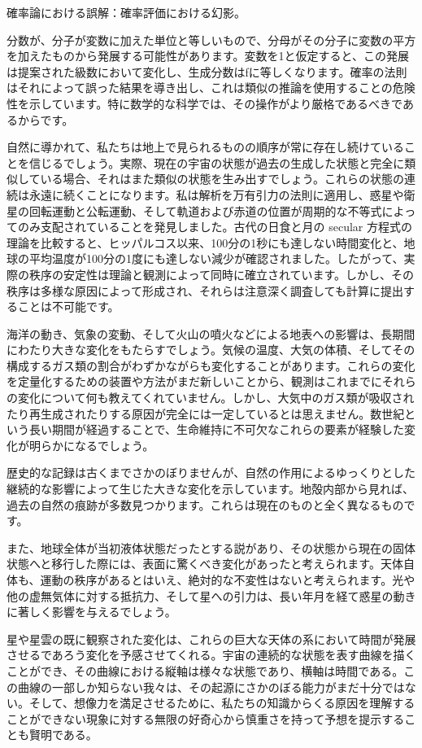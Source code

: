 \documentclass[a4paper,11pt,openany]{ltjsbook}
\begin{document}
確率論における誤解：確率評価における幻影。

分数が、分子が変数に加えた単位と等しいもので、分母がその分子に変数の平方を加えたものから発展する可能性があります。変数を1と仮定すると、この発展は提案された級数において変化し、生成分数はfに等しくなります。確率の法則はそれによって誤った結果を導き出し、これは類似の推論を使用することの危険性を示しています。特に数学的な科学では、その操作がより厳格であるべきであるからです。

自然に導かれて、私たちは地上で見られるものの順序が常に存在し続けていることを信じるでしょう。実際、現在の宇宙の状態が過去の生成した状態と完全に類似している場合、それはまた類似の状態を生み出すでしょう。これらの状態の連続は永遠に続くことになります。私は解析を万有引力の法則に適用し、惑星や衛星の回転運動と公転運動、そして軌道および赤道の位置が周期的な不等式によってのみ支配されていることを発見しました。古代の日食と月の secular 方程式の理論を比較すると、ヒッパルコス以来、100分の1秒にも達しない時間変化と、地球の平均温度が100分の1度にも達しない減少が確認されました。したがって、実際の秩序の安定性は理論と観測によって同時に確立されています。しかし、その秩序は多様な原因によって形成され、それらは注意深く調査しても計算に提出することは不可能です。

海洋の動き、気象の変動、そして火山の噴火などによる地表への影響は、長期間にわたり大きな変化をもたらすでしょう。気候の温度、大気の体積、そしてその構成するガス類の割合がわずかながらも変化することがあります。これらの変化を定量化するための装置や方法がまだ新しいことから、観測はこれまでにそれらの変化について何も教えてくれていません。しかし、大気中のガス類が吸収されたり再生成されたりする原因が完全には一定しているとは思えません。数世紀という長い期間が経過することで、生命維持に不可欠なこれらの要素が経験した変化が明らかになるでしょう。

歴史的な記録は古くまでさかのぼりませんが、自然の作用によるゆっくりとした継続的な影響によって生じた大きな変化を示しています。地殻内部から見れば、過去の自然の痕跡が多数見つかります。これらは現在のものと全く異なるものです。

また、地球全体が当初液体状態だったとする説があり、その状態から現在の固体状態へと移行した際には、表面に驚くべき変化があったと考えられます。天体自体も、運動の秩序があるとはいえ、絶対的な不変性はないと考えられます。光や他の虚無気体に対する抵抗力、そして星への引力は、長い年月を経て惑星の動きに著しく影響を与えるでしょう。


星や星雲の既に観察された変化は、これらの巨大な天体の系において時間が発展させるであろう変化を予感させてくれる。宇宙の連続的な状態を表す曲線を描くことができ、その曲線における縦軸は様々な状態であり、横軸は時間である。この曲線の一部しか知らない我々は、その起源にさかのぼる能力がまだ十分ではない。そして、想像力を満足させるために、私たちの知識からくる原因を理解することができない現象に対する無限の好奇心から慎重さを持って予想を提示することも賢明である。
\end{document}
